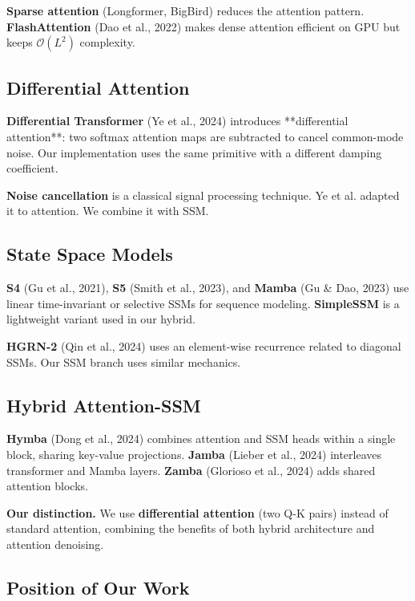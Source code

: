 \textbf{Sparse attention} (Longformer, BigBird) reduces the attention pattern. 
\textbf{FlashAttention} (Dao et al., 2022) makes dense attention efficient on 
GPU but keeps $\mathcal{O}(L^2)$ complexity.

\subsection{Differential Attention}

\textbf{Differential Transformer} (Ye et al., 2024) introduces **differential 
attention**: two softmax attention maps are subtracted to cancel 
common-mode noise. Our implementation uses the same primitive with a 
different damping coefficient.

\textbf{Noise cancellation} is a classical signal processing technique. Ye et al. 
adapted it to attention. We combine it with SSM.

\subsection{State Space Models}

\textbf{S4} (Gu et al., 2021), \textbf{S5} (Smith et al., 2023), and \textbf{Mamba} (Gu \& 
Dao, 2023) use linear time-invariant or selective SSMs for sequence 
modeling. \textbf{SimpleSSM} is a lightweight variant used in our hybrid.

\textbf{HGRN-2} (Qin et al., 2024) uses an element-wise recurrence related to 
diagonal SSMs. Our SSM branch uses similar mechanics.

\subsection{Hybrid Attention-SSM}

\textbf{Hymba} (Dong et al., 2024) combines attention and SSM heads within a 
single block, sharing key-value projections. \textbf{Jamba} (Lieber et al., 2024) 
interleaves transformer and Mamba layers. \textbf{Zamba} (Glorioso et al., 2024) 
adds shared attention blocks.

\textbf{Our distinction.} We use \textbf{differential attention} (two Q-K pairs) 
instead of standard attention, combining the benefits of both hybrid 
architecture and attention denoising.

\subsection{Position of Our Work}


